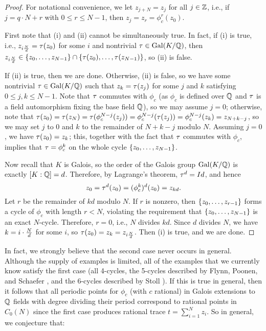 %
%
%
\begin{proof}
  For notational convenience, we let $z_{j+N} = z_j$ for all $j \in
  \mathbb{Z}$, i.e., if $j = q \cdot N + r$ with $0 \le r \le N-1$, then $z_j
  = z_r = \phi_c^r(z_0)$.

  First note that (i) and (ii) cannot be simultaneously true. In fact,
  if (i) is true, i.e., $z_{i\frac{N}{d}} = \tau(z_0)$ for some $i$ and
  nontrivial $\tau \in \mathrm{Gal}(K/\mathbb{Q})$, then $z_{i\frac{N}{d}} \in \left\{z_0, \dots,
    z_{N-1}\right\} \cap \left\{\tau(z_0), \dots, \tau(z_{N-1})\right\}$, so (ii) is
  false.

  If (ii) is true, then we are done. Otherwise, (ii) is false, so we
  have some nontrivial $\tau \in \mathrm{Gal}(K/\mathbb{Q})$ such that $z_k = \tau(z_j)$
  for some $j$ and $k$ satisfying $0 \le j, k \le N-1$. Note that $\tau$
  commutes with $\phi_c$ (as $\phi_c$ is defined over $\mathbb{Q}$ and $\tau$ is
  a field automorphism fixing the base field $\mathbb{Q}$), so we may assume
  $j = 0$; otherwise, note that $\tau(z_0) = \tau(z_N) =
  \tau(\phi_c^{N-j}(z_j)) = \phi_c^{N-j}(\tau(z_j)) = \phi_c^{N-j}(z_k) =
  z_{N+k-j}$, so we may set $j$ to 0 and $k$ to the remainder of
  $N+k-j$ modulo $N$. Assuming $j = 0$, we have $\tau(z_0) = z_k$; this,
  together with the fact that $\tau$ commutes with $\phi_c$, implies
  that $\tau = \phi_c^k$ on the whole cycle $\left\{z_0, \dots, z_{N-1}\right\}$.

  Now recall that $K$ is Galois, so the order of the Galois group
  $\mathrm{Gal}(K/\mathbb{Q})$ is exactly $[K : \mathbb{Q}] = d$. Therefore, by Lagrange's
  theorem, $\tau^d = Id$, and hence
  \[
  z_0 = \tau^d(z_0) = (\phi_c^k)^d(z_0) = z_{kd}.
  \]
  Let $r$ be the remainder of $kd$ modulo $N$. If $r$ is nonzero, then
  $\left\{z_0, \dots, z_{r-1}\right\}$ forms a cycle of $\phi_c$ with length $r
  < N$, violating the requirement that $\left\{z_0, \dots, z_{N-1}\right\}$ is
  an exact $N$-cycle. Therefore, $r = 0$, i.e., $N$ divides
  $kd$. Since $d$ divides $N$, we have $k = i \cdot \frac{N}{d}$ for some $i$,
  so $\tau(z_0) = z_k = z_{i\frac{N}{d}}$. Then (i) is true, and we are done.
\end{proof}

In fact, we strongly believe that the second case never occurs in
general. Although the supply of examples is limited, all of the
examples that we currently know satisfy the first case (all 4-cycles,
the 5-cycles described by Flynn, Poonen, and Schaefer
\cite{MR1480542}, and the 6-cycles described by Stoll
\cite{MR2465796}). If this is true in general, then it follows that
all periodic points for $\phi_c$ (with $c$ rational) in Galois
extensions to $\mathbb{Q}$ fields with degree dividing their period
correspond to rational points in $C_0(N)$ since the first case
produces rational trace $t = \sum_{i=1}^N z_i$.  So in general,
we conjecture that:

